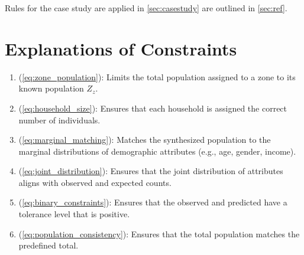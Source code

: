 Rules for the case study are applied in \cref{sec:casestudy} are outlined in \cref{sec:ref}.


\section*{Explanations of Constraints}

\begin{enumerate}[label=\textbf{C\arabic*}, ref=C\arabic*]

    \item (\cref{eq:zone_population}): Limits the total population assigned to a zone to its known population \( Z_z \).

    \item (\cref{eq:household_size}): Ensures that each household is assigned the correct number of individuals.

    \item (\cref{eq:marginal_matching}): Matches the synthesized population to the marginal distributions of demographic attributes (e.g., age, gender, income).

    \item (\cref{eq:joint_distribution}): Ensures that the joint distribution of attributes aligns with observed and expected counts.

    \item (\cref{eq:binary_constraints}): Ensures that the observed and predicted have a tolerance level that is positive.

    \item (\cref{eq:population_consistency}): Ensures that the total population matches the predefined total.






\end{enumerate}
